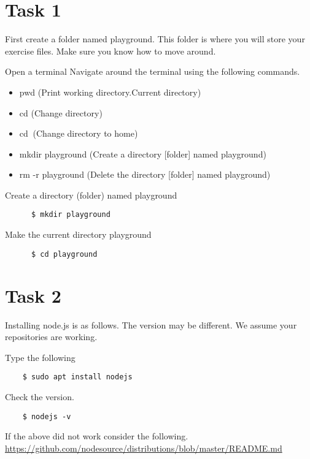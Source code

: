 \documentclass[12pt]{article}
\begin{document}
\section*{Task 1}
First create a folder named playground. This folder is where you will store your exercise files. Make sure you know how to move around. \\
\begin{todolist}
	  \item Open a terminal
	  Navigate around the terminal using the following commands. 
	  \begin{itemize}
	       \item pwd (Print working directory.Current directory) 
	      \item cd (Change directory) 
	      \item cd $~$(Change directory to home)
	      \item mkdir playground (Create a directory [folder] named playground) 
	      \item rm -r playground (Delete the directory [folder] named playground)
	  \end{itemize}
	  \item Create a directory (folder) named playground
	  \begin{lstlisting}
	  $ mkdir playground
	  \end{lstlisting}
	  \item Make the current directory playground 
	  \begin{lstlisting}
	  $ cd playground
	  \end{lstlisting}
\end{todolist}
\section*{Task 2} 
Installing node.js is as follows.  The version may be different. We assume your repositories are working. 
\begin{todolist}
    \item Type the following 
    \begin{lstlisting}
    $ sudo apt install nodejs
    \end{lstlisting}
    \item Check the version. 
    \begin{lstlisting}
    $ nodejs -v
    \end{lstlisting}
    \item If the above did not work consider the following. \\
    \href{https://github.com/nodesource/distributions/blob/master/README.md}{https://github.com/nodesource/distributions/blob/master/README.md}
\end{todolist}
\end{document}
